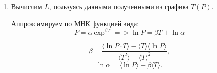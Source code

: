 \documentclass[a4paper, 12pt]{article}%
\begin{document}
\begin{enumerate}
	\begin{figure}[H]
	\end{figure}
	
	\begin{figure}[H]
	\end{figure}
	
	\item Вычислим $L$, пользуясь данными полученными из графика $T(P)$.
	
	Аппроксимируем по МНК функцией вида:
	 \[ P=\alpha \exp^{\beta T}  => \ln P = \beta T + \ln \alpha\]
	
	\[ \beta = \frac{\langle \ln P \cdot T \rangle - \langle T \rangle \langle \ln P \rangle}{\langle T^2 \rangle - \langle T \rangle ^2},\]
	\[ \ln \alpha = \langle \ln P \rangle - \beta\langle T \rangle. \]
	

\end{enumerate}
\end{document}
